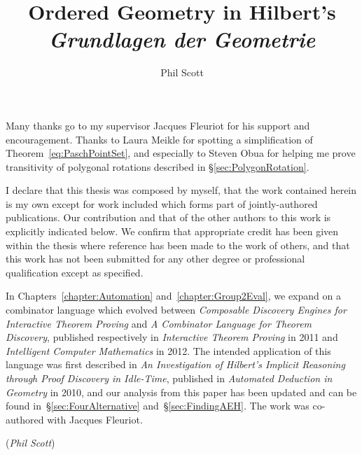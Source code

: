 \documentclass[phd,cisa]{infthesis}
\title{Ordered Geometry in Hilbert's \emph{Grundlagen der Geometrie}}
\author{Phil Scott}
\begin{document}
\begin{preliminary}

\maketitle

\begin{acknowledgements}
Many thanks go to my supervisor Jacques Fleuriot for his support and encouragement. Thanks to Laura Meikle for spotting a simplification of Theorem~\ref{eq:PaschPointSet}, and especially to Steven Obua for helping me prove transitivity of polygonal rotations described in \S\ref{sec:PolygonRotation}.
\end{acknowledgements}

\begin{declaration}
  I declare that this thesis was composed by myself, that the work contained herein is my own except for work included which forms part of jointly-authored publications. Our contribution and that of the other authors to this work is explicitly indicated below. We confirm that appropriate credit has been given within the thesis where reference has been made to the work of others, and that this work has not been submitted for any other degree or professional qualification except as specified.

In Chapters~\ref{chapter:Automation} and~\ref{chapter:Group2Eval}, we expand on a combinator language which evolved between \emph{Composable Discovery Engines for Interactive Theorem Proving} and \emph{A Combinator Language for Theorem Discovery}, published respectively in \emph{Interactive Theorem Proving} in 2011 and \emph{Intelligent Computer Mathematics} in 2012. The intended application of this language was first described in \emph{An Investigation of Hilbert's Implicit Reasoning through Proof
Discovery in Idle-Time}, published in {\em Automated Deduction in Geometry} in 2010, and our analysis from this paper has been updated and can be found in~\S\ref{sec:FourAlternative} and~\S\ref{sec:FindingAEH}. The work was co-authored with Jacques Fleuriot.
   \par
   \vspace{1in}\raggedleft({\em Phil Scott})
 \end{declaration}

\tableofcontents

\end{preliminary}
\end{document}
